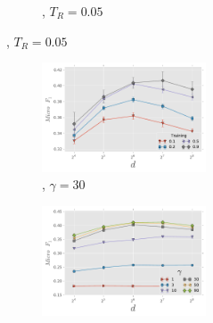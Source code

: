 \begin{figure}[t!]
\begin{subfigure}[b]{\columnwidth}
\begin{subfigure}[b]{\columnwidth}
\begin{subfigure}[b]{0.5\columnwidth}
				    \addtocounter{subfigure}{-1}%
			        \renewcommand\thesubfigure{\alph{subfigure}2}%
	                \caption{\flickr, $T_R=0.05$}
	                \label{fig:stability_flickr-dims_vs_passes}
	        \end{subfigure}%
        \end{subfigure}%
		\hfill
		\begin{subfigure}[b]{\columnwidth} %
        \begin{subfigure}{0.5\columnwidth} %
                \includegraphics[width=\columnwidth]{figures/stability/blogcatalog_training_vs_dimensions.pdf}%
				    \addtocounter{subfigure}{-1}%
			        \renewcommand\thesubfigure{\alph{subfigure}3}%
	                \caption{\blogcatalog, $\gamma=30$}                
        \label{fig:stability_blogcatalog-dims_vs_training}	                
        \end{subfigure}%
        \begin{subfigure}{0.5\columnwidth}%
                \includegraphics[width=\columnwidth]{figures/stability/blogcatalog_walks_per_node_vs_dimensions.pdf}%

\end{subfigure}
\end{subfigure}
\end{subfigure}
\end{figure}

